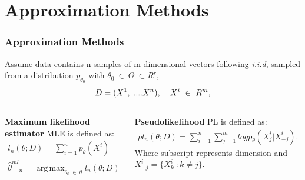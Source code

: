\documentclass[10pt, blue,subsection=true, compress]{beamer}
\DeclareMathOperator*{\argmax}{arg\,max}
\begin{document}
\section{Approximation Methods}
\begin{frame}\frametitle{Approximation Methods}
\begin{block}{}
 Assume data contains n samples of m dimensional vectors 
following \textit{i.i.d}, sampled from a distribution 
$p_{\theta_{0}}$ with $\theta_{0} ~ \in ~\Theta ~ \subset R^r $,
\begin{equation*}
 D = (X^1,.....X^n ),  \: \hspace{3mm}   X^i  ~\in ~ R^m ,
\end{equation*}
\end{block}


\begin{columns}[t]
\begin{flushleft}
\begin{block}{\textbf{Maximum likelihood estimator}} 
MLE is defined as:
\begin{align}
 l_n(\theta ; D) = \sum_{i=1}^n p_{\theta}(X^i)\\
\nonumber {\widehat{\theta}^{ml}}_n  =  \argmax_{\theta_{0} ~\in~ \theta}  l_n (\theta ; D)
\end{align}

\end{block}
\end{flushleft}
\begin{block}{ \textbf{Pseudolikelihood}}
PL is defined as:
\begin{align}
pl_n (\theta ; D) = \sum_{i=1}^n \sum_{j=1}^m log
p_{\theta}({X^i_j} | {X^i_{-j}}). 
\end{align}
Where subscript represents dimension and $X_{-j}^i = \{ X_k^i ~: k \neq j\}$.
\end{block}
\end{columns}
\end{frame}
\end{document}
